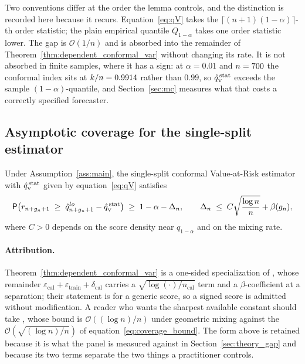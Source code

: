 Two conventions differ at the order the lemma controls, and the distinction is
recorded here because it recurs. Equation~\eqref{eq:qV} takes the
$\lceil (n+1)(1-\alpha)\rceil$-th order statistic; the plain empirical quantile
$Q_{1-\alpha}$ takes one order statistic lower. The gap is $\mathcal O(1/n)$ and
is absorbed into the remainder of Theorem~\ref{thm:dependent_conformal_var}
without changing its rate. It is not absorbed in finite samples, where it has a
sign: at $\alpha = 0.01$ and $n = 700$ the conformal index sits at
$k/n = 0.9914$ rather than $0.99$, so $\hat{q}_{\scriptscriptstyle\mathrm{V}}^{\,\mathrm{stat}}$ exceeds the sample
$(1-\alpha)$-quantile, and Section~\ref{sec:mc} measures what that costs a
correctly specified forecaster.

\subsection{Asymptotic coverage for the single-split estimator}
\label{sec:theory_theorem}

\begin{theorem}
	\label{thm:dependent_conformal_var}
	Under Assumption~\ref{ass:main}, the single-split conformal Value-at-Risk
	estimator with $\hat{q}_{\scriptscriptstyle\mathrm{V}}^{\,\mathrm{stat}}$ given by equation~\eqref{eq:qV} satisfies
	\begin{equation}
		\label{eq:coverage_bound}
		\mathsf{P}\!\left(
		r_{n+g_n+1}\;\ge\;\hat q^{lo}_{n+g_n+1}-\hat{q}_{\scriptscriptstyle\mathrm{V}}^{\,\mathrm{stat}}
		\right)
		\;\ge\;
		1-\alpha-\Delta_n,
		\qquad
		\Delta_n \;\le\; C\sqrt{\frac{\log n}{n}}+\beta(g_n),
	\end{equation}
	where $C>0$ depends on the score density near $q_{1-\alpha}$ and on the
	mixing rate.
\end{theorem}

\paragraph{Attribution.} Theorem~\ref{thm:dependent_conformal_var} is a
one-sided specialization of \citet[Theorem~4]{oliveira2024split}, whose
remainder $\varepsilon_{\mathrm{cal}} + \varepsilon_{\mathrm{train}} +
\delta_{\mathrm{cal}}$ carries a $\sqrt{\log(\cdot)/n_{\mathrm{cal}}}$ term and a
$\beta$-coefficient at a separation; their statement is for a generic score, so
a signed score is admitted without modification. A reader who wants the sharpest
available constant should take \citet{barber2026predictive}, whose bound is
$\mathcal O((\log n)/n)$ under geometric mixing against the
$\mathcal O(\sqrt{(\log n)/n})$ of equation~\eqref{eq:coverage_bound}. The form
above is retained because it is what the panel is measured against in
Section~\ref{sec:theory_gap} and because its two terms separate the two things a
practitioner controls.

